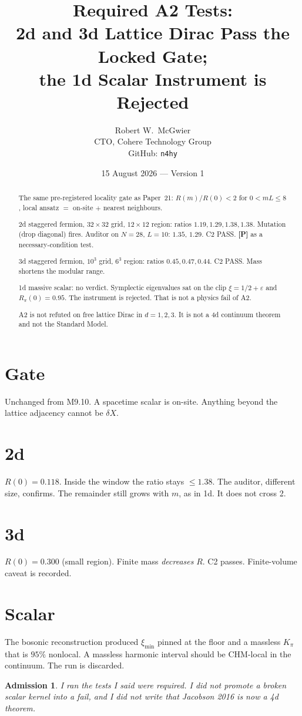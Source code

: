 \documentclass[11pt]{article}
\title{\textbf{Required A2 Tests:\\
2d and 3d Lattice Dirac Pass the Locked Gate;\\
the 1d Scalar Instrument is Rejected}}
\author{Robert W.\ McGwier\\
\small CTO, Cohere Technology Group\\
\small GitHub: \texttt{n4hy}}
\date{15 August 2026 --- Version 1}
\newcommand{\pP}{\textbf{[P]}}
\newtheorem*{admission}{Admission}
\begin{document}
\maketitle

\begin{abstract}
\noindent
The same pre-registered locality gate as Paper~21:
$R(m)/R(0)<2$ for $0<mL\le 8$, local ansatz $=$ on-site $+$ nearest
neighbours.

2d staggered fermion, $32\times 32$ grid, $12\times 12$ region:
ratios $1.19,1.29,1.38,1.38$. Mutation (drop diagonal) fires.
Auditor on $N=28$, $L=10$: $1.35$, $1.29$. C2 PASS. \pP{} as a
necessary-condition test.

3d staggered fermion, $10^3$ grid, $6^3$ region: ratios
$0.45,0.47,0.44$. C2 PASS. Mass shortens the modular range.

1d massive scalar: no verdict. Symplectic eigenvalues sat on the
clip $\xi=1/2+\varepsilon$ and $R_\pi(0)=0.95$. The instrument is
rejected. That is not a physics fail of A2.

A2 is not refuted on free lattice Dirac in $d=1,2,3$. It is not a
4d continuum theorem and not the Standard Model.
\end{abstract}

\section{Gate}

Unchanged from M9.10. A spacetime scalar is on-site. Anything
beyond the lattice adjacency cannot be $\delta X$.

\section{2d}

$R(0)=0.118$. Inside the window the ratio stays $\le 1.38$. The
auditor, different size, confirms. The remainder still grows with
$m$, as in 1d. It does not cross 2.

\section{3d}

$R(0)=0.300$ (small region). Finite mass \emph{decreases} $R$.
C2 passes. Finite-volume caveat is recorded.

\section{Scalar}

The bosonic reconstruction produced $\xi_{\min}$ pinned at the
floor and a massless $K_\pi$ that is $95\%$ nonlocal. A massless
harmonic interval should be CHM-local in the continuum. The run
is discarded.

\begin{admission}
I ran the tests I said were required. I did not promote a broken
scalar kernel into a fail, and I did not write that Jacobson 2016
is now a 4d theorem.
\end{admission}
\end{document}
